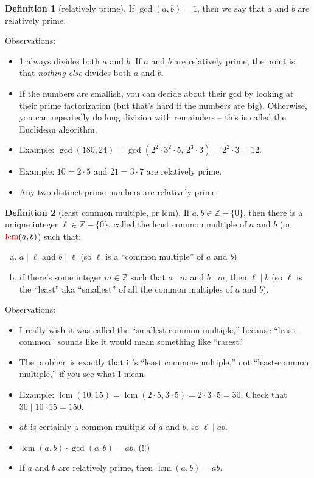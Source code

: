 \documentclass[12pt]{article}
\theoremstyle{definition} %
\newtheorem*{definition}{Definition}
\newcommand{\Alert}[1]{\textcolor{xRed}{#1}}
\newcommand{\Z}{\mathbb{Z}}
\newcommand{\Zstar}{\mathbb{Z} - \{0\}}
\DeclareMathOperator{\lcm}{lcm}
\begin{document}
\begin{definition}[relatively prime]
    If $\gcd(a, b) = 1$, then we say that $a$ and $b$ are \Alert{relatively prime}.
\end{definition}

Observations:
\begin{itemize}
    \item 1 always divides both $a$ and $b$. If $a$ and $b$ are relatively prime, the point is that \textit{nothing else} divides both $a$ and $b$.
    \item If the numbers are smallish, you can decide about their gcd by looking at their prime factorization (but that's hard if the numbers are big). Otherwise, you can repeatedly do long division with remainders -- this is called the \Alert{Euclidean algorithm}.
    \item Example: $\gcd(180, 24) = \gcd(2^2\cdot 3^2 \cdot 5,\, 2^3 \cdot 3) = 2^2 \cdot 3 = 12$.
    \item Example: $10 = 2\cdot 5$ and $21 = 3 \cdot 7$ are relatively prime.
    \item Any two distinct prime numbers are relatively prime.
\end{itemize}

\pagebreak

\begin{definition}[least common multiple, or lcm]
    If $a, b \in \Zstar$, then there is a unique integer $\ell\in\Zstar$, called the \Alert{least common multiple} of $a$ and $b$ (or $\Alert{\lcm}(a, b)$) such that:
    \begin{enumerate}[(a)]
        \item $a\mid \ell$ and $b \mid \ell$ (so $\ell$ is a ``common multiple'' of $a$ and $b$)
        \item if there's some integer $m\in \Z$ such that $a\mid m$ and $b \mid m$, then $\ell \mid b$ (so $\ell$ is the ``least'' aka ``smallest'' of all the common multiples of $a$ and $b$).
    \end{enumerate}
\end{definition}

Observations:
\begin{itemize}
    \item I really wish it was called the ``smallest common multiple,'' because ``least-common'' sounds like it would mean something like ``rarest.'' 
    \item The problem is exactly that it's ``least common-multiple,'' not ``least-common multiple,'' if you see what I mean.
    \item Example: $\lcm(10, 15) = \lcm(2\cdot 5, 3\cdot 5) = 2\cdot 3 \cdot 5 = 30$. Check that $30 \mid 10 \cdot 15 = 150$.
    \item $ab$ is certainly a common multiple of $a$ and $b$, so $\ell \mid ab$.
    \item $\lcm(a, b) \cdot \gcd(a, b) = ab$. (!!)
    \item If $a$ and $b$ are relatively prime, then $\lcm(a, b) = ab$.
\end{itemize}
\end{document}
